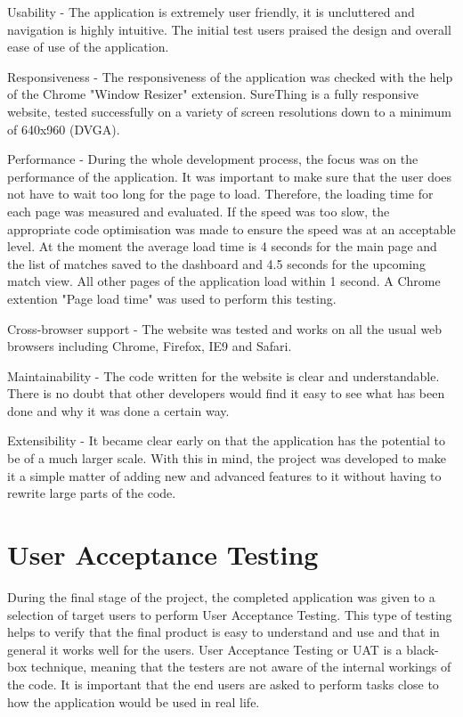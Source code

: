 Usability - The application is extremely user friendly, it is uncluttered and navigation is highly intuitive. The initial test users praised the design and overall ease of use of the application.

Responsiveness - The responsiveness of the application was checked with the help of the Chrome "Window Resizer" extension. SureThing is a fully responsive website, tested successfully on a variety of screen resolutions down to a minimum of 640x960 (DVGA).

Performance - During the whole development process, the focus was on the performance of the application. It was important to make sure that the user does not have to wait too long for the page to load. Therefore, the loading time for each page was measured and evaluated. If the speed was too slow, the appropriate code optimisation was made to ensure the speed was at an acceptable level. At the moment the average load time is 4 seconds for the main page and the list of matches saved to the dashboard and 4.5 seconds for the upcoming match view. All other pages of the application load within 1 second. A Chrome extention "Page load time" was used to perform this testing.

Cross-browser support - The website was tested and works on all the usual web browsers including Chrome, Firefox, IE9 and Safari.

Maintainability - The code written for the website is clear and understandable.  There is no doubt that other developers would find it easy to see what has been done and why it was done a certain way.

Extensibility - It became clear early on that the application has the potential to be of a much larger scale.  With this in mind, the project was developed to make it a simple matter of adding new and advanced features to it without having to rewrite large parts of the code.


\section{User Acceptance Testing}
\label{sec:uat_test}
During the final stage of the project, the completed application was given to a selection of target users to perform User Acceptance Testing. This type of testing helps to verify that the final product is easy to understand and use and that in general it works well for the users. User Acceptance Testing or UAT is a black-box technique, meaning that the testers are not aware of the internal workings of the code. It is important that the end users are asked to perform tasks close to how the application would be used in real life.

